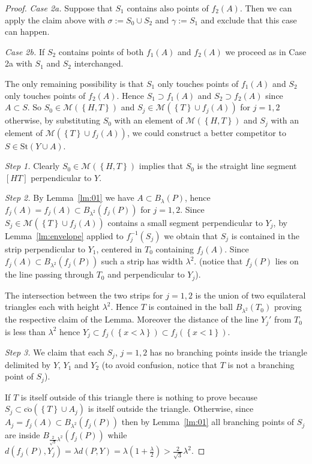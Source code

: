 \documentclass{amsart}
\newcommand{\enclose}[1]{\left(#1\right)}
\newcommand{\ENCLOSE}[1]{\left\{#1\right\}}
\newcommand{\St}{\mathrm{St}}
\newcommand{\M}{\mathcal{M}}
\newcommand{\co}{\mathrm{co}}
\theoremstyle{definition}
\theoremstyle{remark}
\begin{document}
\begin{proof}
  \emph{Case 2a.} 
  Suppose that $S_1$ contains also points of $f_2(A)$.
  Then we can apply the claim above with 
  $\sigma:= S_0 \cup S_2$ and 
  $\gamma:= S_1$ and exclude that this case can happen.
  
  \emph{Case 2b.} If $S_2$ contains points of both 
  $f_1(A)$ and $f_2(A)$ we proceed 
  as in Case 2a with $S_1$ and $S_2$ interchanged.
  
  The only remaining possibility is that $S_1$ 
  only touches points of $f_1(A)$ 
  and $S_2$ only touches points of $f_2(A)$. 
  Hence $S_1\supset f_1(A)$ and $S_2\supset f_2(A)$ since $A\subset S$.
  So $S_0\in \M(\ENCLOSE{H,T})$  
  and $S_j \in \M(\ENCLOSE{T} \cup f_j(A))$ for $j=1,2$
  otherwise, by substituting $S_0$ with an element of $\M(\ENCLOSE{H,T})$
  and $S_j$ with an element of $\M(\ENCLOSE{T}\cup f_j(A))$,
  we could construct a better competitor 
  to $S\in \St(Y\cup A)$.
  
  \emph{Step 1.} 
  Clearly $S_0\in \M(\ENCLOSE{H,T})$ implies that $S_0$ is the straight 
  line segment $[HT]$ perpendicular to $Y$.
  
  \emph{Step 2.}
  By Lemma~\ref{lm:01} we have $A\subset B_\lambda(P)$,
  hence $f_j(A) = f_j(A) \subset B_{\lambda^2}(f_j(P))$
  for $j=1,2$.
  Since $S_j \in \M(\ENCLOSE{T}\cup f_j(A))$
  contains a small segment perpendicular to $Y_j$,
  by Lemma~\ref{lm:envelope} applied to $f_j^{-1}(S_j)$
  we obtain that $S_j$ is contained in the strip perpendicular 
  to $Y_1$, centered in $T_0$
  containing $f_j(A)$. 
  Since $f_j(A)\subset B_{\lambda^2}(f_j(P))$
  such a strip has width $\lambda^2$.
  (notice that $f_j(P)$ lies on the line passing through $T_0$ and perpendicular 
  to $Y_j$).
  
  The intersection between the two strips for $j=1,2$ 
  is the union of two equilateral 
  triangles each with height $\lambda^2$. 
  Hence $T$ is contained in the ball
  $B_{\lambda^2}(T_0)$ proving the respective claim of the Lemma.
  Moreover the distance of the line $Y_j'$ from $T_0$ is less than 
  $\lambda^2$ hence $Y_j\subset f_j(\ENCLOSE{x<\lambda})
  \subset f_j(\ENCLOSE{x<1})$.
  
  \emph{Step 3.}
  We claim that each $S_j$, $j=1,2$ has no branching points inside the triangle 
  delimited by $Y$, $Y_1$ and $Y_2$ 
  (to avoid confusion, notice that $T$ is not a branching point of $S_j$).
 
  If $T$ is itself outside of this triangle there is nothing to prove
  because $S_j\subset \overline{\co}(\ENCLOSE{T}\cup A_j)$ 
  is itself outside the triangle.
  Otherwise, 
  since $A_j=f_j(A)\subset B_{\lambda^2}(f_j(P))$
  then by Lemma~\ref{lm:01} all branching points of $S_j$ 
  are inside $B_{\frac{2}{\sqrt 3}\lambda^2}(f_j(P))$ while 
  $d(f_j(P),Y_j)=\lambda d(P,Y)
  = \lambda \enclose{1+\frac{\lambda} 2 }
  > \frac{2}{\sqrt 3}\lambda^2$.
  

\end{proof}
\end{document}
